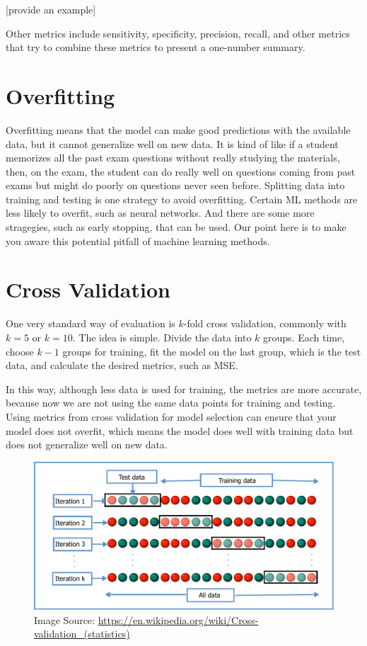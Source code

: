 \documentclass[
]{book}
\begin{document}
{[}provide an example{]}

Other metrics include sensitivity, specificity, precision, recall, and other metrics that try to combine these metrics to present a one-number summary.

\hypertarget{overfitting}{%
\section{Overfitting}\label{overfitting}}

Overfitting means that the model can make good predictions with the available data, but it cannot generalize well on new data. It is kind of like if a student memorizes all the past exam questions without really studying the materials, then, on the exam, the student can do really well on questions coming from past exams but might do poorly on questions never seen before. Splitting data into training and testing is one strategy to avoid overfitting. Certain ML methods are less likely to overfit, such as neural networks. And there are some more stragegies, such as early stopping, that can be used. Our point here is to make you aware this potential pitfall of machine learning methods.

\hypertarget{cross-validation}{%
\section{Cross Validation}\label{cross-validation}}

One very standard way of evaluation is \(k\)-fold cross validation, commonly with \(k=5\) or \(k=10\). The idea is simple. Divide the data into \(k\) groups. Each time, choose \(k-1\) groups for training, fit the model on the last group, which is the test data, and calculate the desired metrics, such as MSE.

In this way, although less data is used for training, the metrics are more accurate, because now we are not using the same data points for training and testing. Using metrics from cross validation for model selection can ensure that your model does not overfit, which means the model does well with training data but does not generalize well on new data.

\begin{figure}
\centering
\includegraphics{images/K-fold_cross_validation_EN.pdf}
\caption{\label{fig:unnamed-chunk-8}Image Source: \url{https://en.wikipedia.org/wiki/Cross-validation_(statistics)}}
\end{figure}
\end{document}
